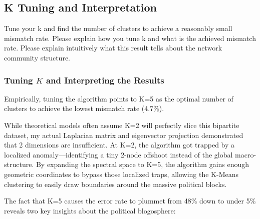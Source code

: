 \documentclass[twoside, 10pt]{article}
\begin{document}
\subsection{K Tuning and Interpretation}
Tune your k and find the number of clusters to achieve a reasonably small mismatch rate. Please explain how you tune k and what is the achieved mismatch rate. Please explain intuitively what
this result tells about the network community structure.

\subsubsection{Tuning $K$ and Interpreting the Results}
Empirically, tuning the algorithm points to K=5 as the optimal number of clusters to achieve the lowest mismatch rate (4.7\%).

While theoretical models often assume K=2 will perfectly slice this bipartite dataset, my actual Laplacian matrix and eigenvector projection demonstrated that 2 dimensions are insufficient. At K=2, the algorithm got trapped by a localized anomaly—identifying a tiny 2-node offshoot instead of the global macro-structure. By expanding the spectral space to K=5, the algorithm gains enough geometric coordinates to bypass those localized traps, allowing the K-Means clustering to easily draw boundaries around the massive political blocks.

The fact that K=5 causes the error rate to plummet from 48\% down to under 5\% reveals two key insights about the political blogosphere:
\end{document}
